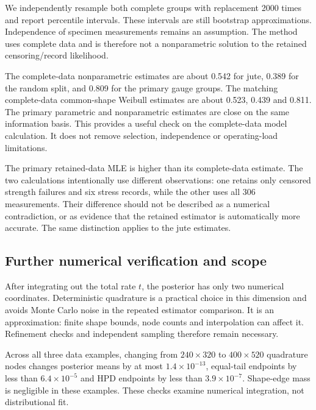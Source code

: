 We independently resample both complete groups with replacement 2000 times and report percentile intervals. These intervals are still bootstrap approximations. Independence of specimen measurements remains an assumption. The method uses complete data and is therefore not a nonparametric solution to the retained censoring/record likelihood.



The complete-data nonparametric estimates are about 0.542 for jute, 0.389 for the random split, and 0.809 for the primary gauge groups. The matching complete-data common-shape Weibull estimates are about 0.523, 0.439 and 0.811. The primary parametric and nonparametric estimates are close on the same information basis. This provides a useful check on the complete-data model calculation. It does not remove selection, independence or operating-load limitations.

The primary retained-data MLE is higher than its complete-data estimate. The two calculations intentionally use different observations: one retains only censored strength failures and six stress records, while the other uses all 306 measurements. Their difference should not be described as a numerical contradiction, or as evidence that the retained estimator is automatically more accurate. The same distinction applies to the jute estimates.

\FloatBarrier

\subsection{Further numerical verification and scope}\label{sec:further-checks}
After integrating out the total rate $t$, the posterior has only two numerical coordinates. Deterministic quadrature is a practical choice in this dimension and avoids Monte Carlo noise in the repeated estimator comparison. It is an approximation: finite shape bounds, node counts and interpolation can affect it. Refinement checks and independent sampling therefore remain necessary.

Across all three data examples, changing from $240\times320$ to $400\times520$ quadrature nodes changes posterior means by at most $1.4\times10^{-13}$, equal-tail endpoints by less than $6.4\times10^{-5}$ and HPD endpoints by less than $3.9\times10^{-7}$. Shape-edge mass is negligible in these examples. These checks examine numerical integration, not distributional fit.


